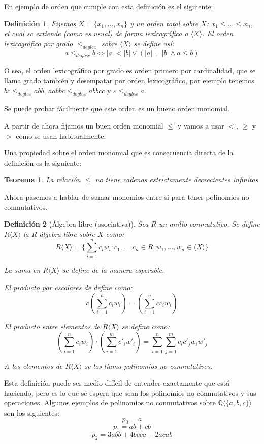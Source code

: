 \documentclass{report}
\theoremstyle{customstyle}
\newtheorem{definition}{Definición}[chapter]
\newtheorem{theorem}{Teorema}[chapter]
\theoremstyle{factstyle}
\begin{document}
En ejemplo de orden que cumple con esta definición es el siguiente:

\begin{definition}
  Fijemos $X = \{x_1, …, x_n\}$ y un orden total sobre $X$: $x_1 ≤ … ≤ x_n$, el cual se extiende (como es usual) de forma lexicográfica a $⟨X⟩$. El orden lexicográfico por grado $ ≤_{deglex}$ sobre $⟨X⟩$ se define así:
  \[ a ≤_{deglex} b ⇔ |a| < |b| ∨ (|a| = |b| ∧ a ≤ b) \]
\end{definition}

O sea, el orden lexicográfico por grado es orden primero por cardinalidad, que se llama grado también y desempatar por orden lexicográfico, por ejemplo tenemos $bc ≤_{deglex} abb$, $aabbc ≤_{deglex} abbcc$ y $ε ≤_{deglex} a$.

Se puede probar fácilmente que este orden es un bueno orden monomial.

A partir de ahora fijamos un buen orden monomial $≤$ y vamos a usar $<$, $≥$ y $>$ como se usan habitualmente.

Una propiedad sobre el orden monomial que es consecuencia directa de la definición es la siguiente:

\begin{theorem}\label{thm:≤ no cadenas dec inf}
  La relación $≤$ no tiene cadenas estrictamente decrecientes infinitas
\end{theorem}

Ahora pasemos a hablar de sumar monomios entre si para tener polinomios no conmutativos.

\begin{definition}[Álgebra libre (asociativa)]
  Sea $R$ un anillo conmutativo. Se define $R⟨X⟩$ la $R$-álgebra libre sobre $X$ como:
  \[ R⟨X⟩ = \{∑_{i = 1}^n c_i w_i : c_1, …, c_n ∈ R, w_1, …, w_n ∈ ⟨X⟩\} \]

  La suma en $R⟨X⟩$ se define de la manera esperable.

  El producto por escalares de define como:
  \[ c (∑_{i = 1}^n c_i w_i) = (∑_{i = 1}^n c c_i w_i) \]

  El producto entre elementos de $R⟨X⟩$ se define como:
  \[ (∑_{i = 1}^n c_i w_i) · (∑_{i = 1}^m c'_i w'_i) = ∑_{i = 1}^n ∑_{j = 1}^m c_i c'_j w_i w'_j \]

  A los elementos de $R⟨X⟩$ se los llama polinomios no conmutativos.
\end{definition}

Esta definición puede ser medio difícil de entender exactamente que está haciendo, pero es lo que se espera que sean los polinomios no conmutativos y sus operaciones. Algunos ejemplos de polinomios no conmutativos sobre $ℚ⟨\{a, b, c\}⟩$ son los siguientes:
\[ p_0 = a \]
\[ p_1 = ab + cb \]
\[ p_2 = 3 abb + 4 bcca - 2 acab \]
\end{document}
